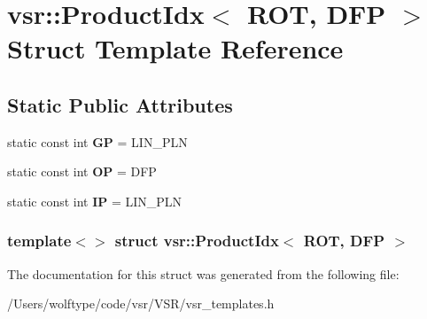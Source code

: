 \hypertarget{structvsr_1_1_product_idx_3_01_r_o_t_00_01_d_f_p_01_4}{\section{vsr\-:\-:Product\-Idx$<$ R\-O\-T, D\-F\-P $>$ Struct Template Reference}
\label{structvsr_1_1_product_idx_3_01_r_o_t_00_01_d_f_p_01_4}
}
\subsection*{Static Public Attributes}
\begin{DoxyCompactItemize}
\item 
\hypertarget{structvsr_1_1_product_idx_3_01_r_o_t_00_01_d_f_p_01_4_a71fe04f1f992796cbb5551e0b28ca226}{static const int {\bfseries G\-P} = L\-I\-N\-\_\-\-P\-L\-N}\label{structvsr_1_1_product_idx_3_01_r_o_t_00_01_d_f_p_01_4_a71fe04f1f992796cbb5551e0b28ca226}

\item 
\hypertarget{structvsr_1_1_product_idx_3_01_r_o_t_00_01_d_f_p_01_4_a64e0771566f8cea41ee8eba8a63d4282}{static const int {\bfseries O\-P} = D\-F\-P}\label{structvsr_1_1_product_idx_3_01_r_o_t_00_01_d_f_p_01_4_a64e0771566f8cea41ee8eba8a63d4282}

\item 
\hypertarget{structvsr_1_1_product_idx_3_01_r_o_t_00_01_d_f_p_01_4_a88157b7155473e7f38b6df452b717dc5}{static const int {\bfseries I\-P} = L\-I\-N\-\_\-\-P\-L\-N}\label{structvsr_1_1_product_idx_3_01_r_o_t_00_01_d_f_p_01_4_a88157b7155473e7f38b6df452b717dc5}

\end{DoxyCompactItemize}
\subsubsection*{template$<$$>$ struct vsr\-::\-Product\-Idx$<$ R\-O\-T, D\-F\-P $>$}



The documentation for this struct was generated from the following file\-:\begin{DoxyCompactItemize}
\item 
/\-Users/wolftype/code/vsr/\-V\-S\-R/vsr\-\_\-templates.\-h\end{DoxyCompactItemize}
